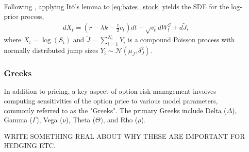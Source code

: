 
Following \textcite{contFinancialModellingJump2003}, applying Itô's lemma to \eqref{eq:bates_stock} yields the SDE for the log-price process,
\begin{align}
    dX_t = \left(r - \lambda \bar{k} - \frac{1}{2}v_t\right)dt + \sqrt{v_t}dW_t^S + d \tilde{J}, \label{eq:bates_logprice}
\end{align}
where $X_t = \log(S_t)$ and $\tilde{J} = \sum_{i=1}^{N_t} Y_i$ is a compound Poisson process with normally distributed jump sizes $Y_i \sim \mathcal{N}(\mu_J, \delta_J^2)$. 


\subsubsection{Greeks}

In addition to pricing, a key aspect of option risk management involves computing sensitivities of the option price to various model parameters, commonly referred to as the "Greeks". The primary Greeks include Delta ($\Delta$), Gamma ($\Gamma$), Vega ($\nu$), Theta ($\Theta$), and Rho ($\rho$). 

WRITE SOMETHING REAL ABOUT WHY THESE ARE IMPORTANT FOR HEDGING ETC. 
